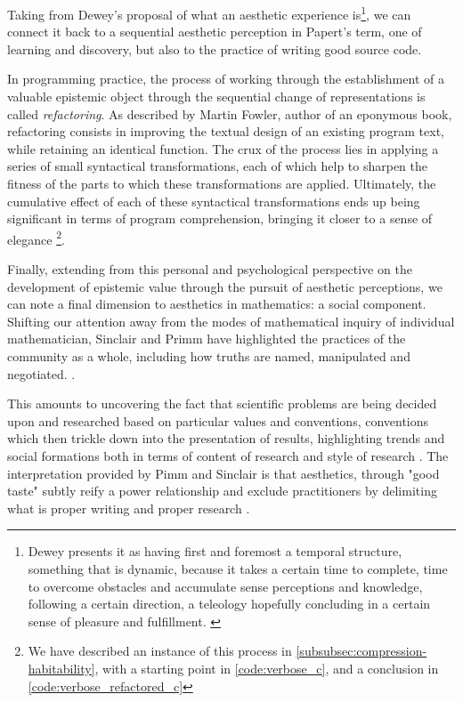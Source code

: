 Taking from Dewey's proposal of what an aesthetic experience is\footnote{Dewey presents it as having first and foremost a temporal structure, something that is dynamic, because it takes a certain time to complete, time to overcome obstacles and accumulate sense perceptions and knowledge, following a certain direction, a teleology hopefully concluding in a certain sense of pleasure and fulfillment. \citep{leddy_dewey_2021}}, we can connect it back to a sequential aesthetic perception in Papert's term, one of learning and discovery, but also to the practice of writing good source code.

In programming practice, the process of working through the establishment of a valuable epistemic object through the sequential change of representations is called \emph{refactoring}. As described by Martin Fowler, author of an eponymous book, refactoring consists in improving the textual design of an existing program text, while retaining an identical function. The crux of the process lies in applying a series of small syntactical transformations, each of which help to sharpen the fitness of the parts to which these transformations are applied. Ultimately, the cumulative effect of each of these syntactical transformations ends up being significant in terms of program comprehension, bringing it closer to a sense of elegance \citep{fowler_refactoring_1999}\footnote{We have described an instance of this process in \autoref{subsubsec:compression-habitability}, with a starting point in \autoref{code:verbose_c}, and a conclusion in \autoref{code:verbose_refactored_c}}.

Finally, extending from this personal and psychological perspective on the development of epistemic value through the pursuit of aesthetic perceptions, we can note a final dimension to aesthetics in mathematics: a social component. Shifting our attention away from the modes of mathematical inquiry of individual mathematician, Sinclair and Primm have highlighted the practices of the community as a whole, including how truths are named, manipulated and negotiated. \citep{sinclair_aesthetic_2011}.

This amounts to uncovering the fact that scientific problems are being decided upon and researched based on particular values and conventions, conventions which then trickle down into the presentation of results, highlighting trends and social formations both in terms of content of research and style of research \citep{depaz_stylistique_2023}. The interpretation provided by Pimm and Sinclair is that aesthetics, through "good taste" subtly reify a power relationship and exclude practitioners by delimiting what is proper writing and proper research \citep{sinclair_many_2010}.

